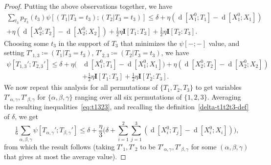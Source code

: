 \documentclass[12pt,reqno,tbtags]{amsart}
\theoremstyle{definition}
\theoremstyle{remark}
\renewcommand{\leq}{\leqslant}
\newcommand{\I}[1]{\mathbf{I}[#1]}
\newcommand{\dist}[2]{{\operatorname{d}[#1;#2]}} %
\numberwithin{equation}{section}
\begin{document}
\begin{proof}
Putting the above observations together, we have
\begin{align*}
 \sum_{t_3}p_{T_3}(t_3) \psi[(T_1 | T_3=t_3); (T_2 | T_3=t_3)] \leq \delta + \eta (\dist{X^0_1}{T_1}-\dist{X^0_1}{X_1}) \\
   + \eta (\dist{X^0_2}{T_2}-\dist{X^0_2}{X_2}) + \tfrac12 \eta \I{T_1:T_3} + \tfrac12 \eta \I{T_2:T_3}.
 \end{align*}
 Choosing some $t_3$ in the support of $T_3$ that minimizes the $\psi[-;-]$ value, and setting $T'_{1,3} \coloneqq (T_1 | T_3 = t_3)$, $T'_{2,3} \coloneqq (T_2 | T_3 = t_3)$, we have
\begin{align}\nonumber
 \psi[T_{1,3}';T_{2,3}'] \leq \delta + \eta (& \dist{X^0_1}{T_1}-\dist{X^0_1}{X_1})
    + \eta (\dist{X^0_2}{T_2}-\dist{X^0_2}{X_2}) \\ & + \tfrac12 \eta \I{T_1:T_3} + \tfrac12 \eta \I{T_2:T_3}.
   \label{eq:t1323}
\end{align}
We now repeat this analysis for all permutations of $\{T_1,T_2,T_3\}$ to get variables $T'_{\alpha,\gamma}, T'_{\beta,\gamma}$ for $\{\alpha,\beta,\gamma\}$ ranging over all six permutations of $\{1,2,3\}$.
Averaging the resulting inequalities~\eqref{eq:t1323}, and recalling the definition~\eqref{delta-t1t2t3-def} of $\delta$, we get
\[ \tfrac16 \sum_{\alpha,\beta,\gamma} \psi[T_{\alpha,\gamma}';T_{\beta,\gamma}']  \leq  \delta + \frac{\eta}{3} \biggl( \delta + \sum_{i=1}^2 \sum_{j = 1}^3 (\dist{X^0_i}{T_j}-\dist{X^0_i}{X_i}) \biggr),
\]
from which the result follows (taking $T'_1,T'_2$ to be $T'_{\alpha,\gamma},T'_{\beta,\gamma}$ for some $(\alpha,\beta,\gamma)$ that gives at most the average value).
\end{proof}
\end{document}
